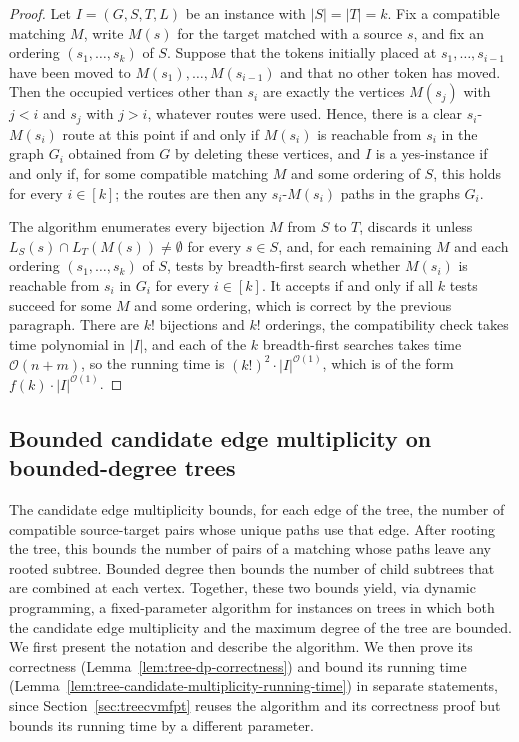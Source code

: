 \documentclass[a4paper,USenglish,thm-restate]{lipics-v2021}
\theoremstyle{problemstyle}
\begin{document}
\begin{proof}
Let $I=(G,S,T,L)$ be an instance with $|S|=|T|=k$. Fix a compatible matching
$M$, write $M(s)$ for the target matched with a source $s$, and fix an
ordering $(s_1,\ldots,s_k)$ of $S$. Suppose that the tokens initially placed
at $s_1,\ldots,s_{i-1}$ have been moved to $M(s_1),\ldots,M(s_{i-1})$ and
that no other token has moved. Then the occupied vertices other than $s_i$
are exactly the vertices $M(s_j)$ with $j<i$ and $s_j$ with $j>i$, whatever
routes were used. Hence, there is a clear $s_i$-$M(s_i)$ route at this point
if and only if $M(s_i)$ is reachable from $s_i$ in the graph $G_i$ obtained
from $G$ by deleting these vertices, and $I$ is a yes-instance if and only
if, for some compatible matching $M$ and some ordering of $S$, this holds
for every $i\in[k]$; the routes are then any $s_i$-$M(s_i)$ paths in the
graphs $G_i$.

The algorithm enumerates every bijection $M$ from $S$ to $T$, discards it
unless $L_S(s)\cap L_T(M(s))\neq\emptyset$ for every $s\in S$, and, for
each remaining $M$ and each ordering $(s_1,\ldots,s_k)$ of $S$, tests by
breadth-first search whether $M(s_i)$ is reachable from $s_i$ in $G_i$ for
every $i\in[k]$. It accepts if and only if all $k$ tests succeed for some
$M$ and some ordering, which is correct by the previous paragraph. There are
$k!$ bijections and $k!$ orderings, the compatibility check takes time
polynomial in $|I|$, and each of the $k$ breadth-first searches takes time
$\mathcal{O}(n+m)$, so the running time is
$(k!)^2\cdot|I|^{\mathcal{O}(1)}$, which is of the form
$f(k)\cdot|I|^{\mathcal{O}(1)}$.
\end{proof}


\subsection{Bounded candidate edge multiplicity on bounded-degree trees}
\label{sec:treefpt}

The candidate edge multiplicity bounds, for each edge of the tree, the number of compatible source-target pairs whose unique paths use that edge. After rooting the tree, this bounds the number of pairs of a matching whose paths leave any rooted subtree. Bounded degree then bounds the number of child subtrees that are combined at each vertex. Together, these two bounds yield, via dynamic programming, a fixed-parameter algorithm for instances on trees in which both the candidate edge multiplicity and the maximum degree of the tree are bounded. We first present the notation and describe the algorithm. We then prove its correctness (Lemma~\ref{lem:tree-dp-correctness}) and bound its running time (Lemma~\ref{lem:tree-candidate-multiplicity-running-time}) in separate statements, since Section~\ref{sec:treecvmfpt} reuses the algorithm and its correctness proof but bounds its running time by a different parameter.
\end{document}
